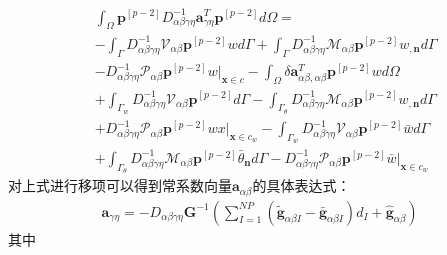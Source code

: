 \begin{equation}
\begin{split}
        &\int_{\Omega}\pmb{p}^{[p-2]}D^{-1}_{\alpha\beta\gamma\eta}\pmb{a}_{\gamma\eta}^T\pmb{p}^{[p-2]}d\Omega=\\
        &-\int_{\Gamma}D_{\alpha\beta\gamma\eta}^{-1}\mathcal{V}_{\alpha\beta}\pmb{p}^{[p-2]}wd\Gamma
        +\int_{\Gamma}D_{\alpha\beta\gamma\eta}^{-1}\mathcal{M}_{\alpha\beta}\pmb{p}^{[p-2]}w_{,\pmb{n}}d\Gamma\\
        &-D_{\alpha\beta\gamma\eta}^{-1}\mathcal{P}_{\alpha\beta}\pmb{p}^{[p-2]}w\vert_{\pmb x\in c}
        -\int_{\Omega}\delta\pmb{a}_{\alpha\beta,\alpha\beta}^T\pmb{p}^{[p-2]}wd\Omega\\
        &+\int_{\Gamma_w}D_{\alpha\beta\gamma\eta}^{-1}\mathcal{V}_{\alpha\beta}\pmb{p}^{[p-2]}d\Gamma
        -\int_{\Gamma_{\theta}}D_{\alpha\beta\gamma\eta}^{-1}\mathcal{M}_{\alpha\beta}\pmb{p}^{[p-2]}w_{,\pmb{n}}d\Gamma\\
        &+D_{\alpha\beta\gamma\eta}^{-1}\mathcal{P}_{\alpha\beta}\pmb{p}^{[p-2]}wx\vert_{\pmb x\in{c_w}}
        -\int_{\Gamma_w}D_{\alpha\beta\gamma\eta}^{-1}\mathcal{V}_{\alpha\beta}\pmb{p}^{[p-2]}\bar{w}d\Gamma\\
        &+\int_{\Gamma_{\theta}}D_{\alpha\beta\gamma\eta}^{-1}\mathcal{M}_{\alpha\beta}\pmb{p}^{[p-2]}\bar{\theta}_{\pmb{n}}d\Gamma
        -D_{\alpha\beta\gamma\eta}^{-1}\mathcal{P}_{\alpha\beta}\pmb{p}^{[p-2]}\bar{w}\vert_{\pmb x\in{c_w}}
\end{split}
\end{equation}
对上式进行移项可以得到常系数向量$\pmb{a}_{\alpha\beta}$的具体表达式：
\begin{equation}\label{aalphabeta}
\begin{split}
    \pmb{a}_{\gamma\eta}=-D_{\alpha\beta\gamma\eta}\pmb{G}^{-1}(\sum_{I=1}^{N\!P}(\tilde{\pmb g}_{\alpha\beta I}-\bar{\pmb g}_{\alpha\beta I})d_I+\hat{\pmb g}_{\alpha\beta})
\end{split}
\end{equation}
其中
\newpage
